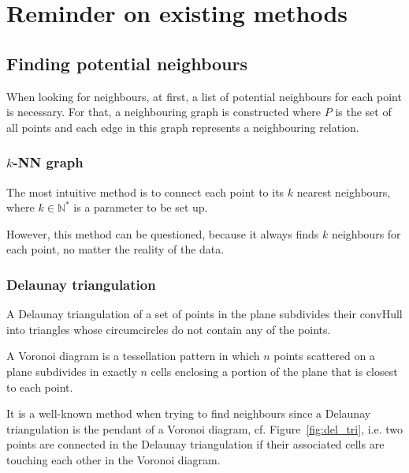 \documentclass[lettersize,journal,english]{IEEEtran}
\begin{document}
\section{Reminder on existing methods\label{sec:reminder}}
    \subsection{Finding potential neighbours}
        When looking for neighbours, at first, a list of potential neighbours for each point is necessary.
        For that, a neighbouring graph is constructed where $P$ is the set of all points and each edge in this graph represents a neighbouring relation.

        \subsubsection{$k$-NN graph}
            The most intuitive method is to connect each point to its $k$ nearest neighbours, where $k \in \mathbb{N}^*$ is a parameter to be set up. 

            However, this method can be questioned, because it always finds $k$ neighbours for each point, no matter the reality of the data.

        \subsubsection{Delaunay triangulation}
            A Delaunay triangulation \cite{art_delaunay} of a set of points in the plane subdivides their \gls{convHull} into triangles whose circumcircles do not contain any of the points.

            A Voronoi diagram is a tessellation pattern in which $n$ points scattered on a plane subdivides in exactly $n$ cells enclosing a portion of the plane that is closest to each point. 

            It is a well-known method when trying to find neighbours \cite{delaunay_neighbor} since a Delaunay triangulation is the pendant of a Voronoi diagram, cf. Figure~\ref{fig:del_tri}, i.e. two points are connected in the
            Delaunay triangulation if their associated cells are touching each other in the Voronoi diagram.
\end{document}
